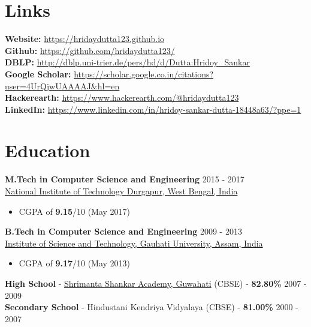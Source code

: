 \documentclass[margin, centered]{res}
\begin{document}
\begin{resume}
\section{Links}
\textbf{Website:} \url{https://hridaydutta123.github.io} \\
\textbf{Github:} \url{https://github.com/hridaydutta123/} \\
\textbf{DBLP:} \url{http://dblp.uni-trier.de/pers/hd/d/Dutta:Hridoy_Sankar} \\
\textbf{Google Scholar:} \url{https://scholar.google.co.in/citations?user=4UrQjwUAAAAJ&hl=en} \\
\textbf{Hackerearth:} \url{https://www.hackerearth.com/@hridaydutta123} \\
\textbf{LinkedIn:} \url{https://www.linkedin.com/in/hridoy-sankar-dutta-18448a63/?ppe=1} \\


\section{Education}
\textbf{M.Tech in Computer Science and Engineering} \hfill 2015 - 2017 \\
\href{http://www.nitdgp.ac.in/}{National Institute of Technology Durgapur, West Bengal, India}
\begin{itemize}
 \item CGPA of \textbf{9.15}/10 (May 2017)
\end{itemize}
\textbf{B.Tech in Computer Science and Engineering} \hfill 2009 - 2013 \\
\href{http://www.gauhati.ac.in/}{Institute of Science and Technology, Gauhati University, Assam, India}
\begin{itemize}
 \item CGPA of \textbf{9.17}/10 (May 2013)
\end{itemize}
\textbf{High School} - \href{http://www.ssa-school.org/}{Shrimanta Shankar Academy, Guwahati} (CBSE) - \textbf{82.80\%} \hfill 2007 - 2009 \\
\textbf{Secondary School} - Hindustani Kendriya Vidyalaya (CBSE) - \textbf{81.00\%} \hfill 2000 - 2007
 

\end{resume}
\end{document}
